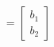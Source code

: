 \documentclass[preview]{standalone}
\begin{document}
\begin{align*}
= \begin{bmatrix} b_1 \\ b_2 \end{bmatrix}
\end{align*}
\end{document}
